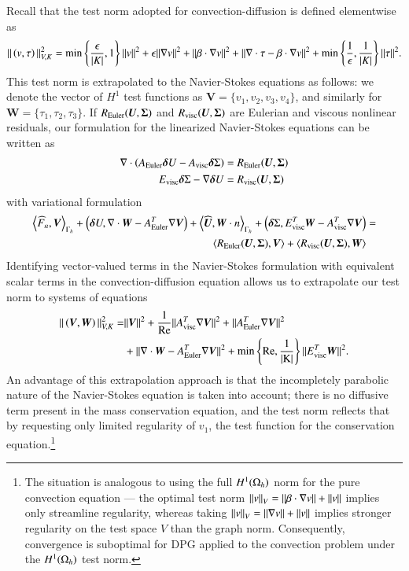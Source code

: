 Recall that the test norm adopted for convection-diffusion is defined elementwise as
\[
\|\left(v,\tau\right)\|_{V,K}^2 = \min\left\{\frac{\epsilon}{|K|},1\right\}\|v\|^2 + \epsilon \|\grad v\|^2 + \|\beta \cdot \grad v\|^2 + \| \div \tau-\beta\cdot\grad v\|^2 + \min\left\{\frac{1}{\epsilon},\frac{1}{|K|}\right\}\|\tau\|^2.
\]
This test norm is extrapolated to the Navier-Stokes equations as follows: we denote the vector of $H^1$ test functions as $\boldsymbol V=\{v_1,v_2,v_3,v_4\}$, and similarly for $\boldsymbol W = \{\tau_1,\tau_2,\tau_3\}$. If $R_{\rm Euler}(\boldsymbol U,\boldsymbol \Sigma)$ and $R_{\rm visc}(\boldsymbol U,\boldsymbol \Sigma)$ are Eulerian and viscous nonlinear residuals, our formulation for the linearized Navier-Stokes equations can be written as
\begin{align*}
\div \left(A_{\rm Euler}\boldsymbol \delta U - A_{\rm visc}\boldsymbol \delta \Sigma\right) &= R_{\rm Euler}(\boldsymbol U,\boldsymbol \Sigma)\\
E_{\rm visc}\boldsymbol  \delta \Sigma - \grad \boldsymbol \delta U &= R_{\rm visc}(\boldsymbol U,\boldsymbol \Sigma)
\end{align*}
with variational formulation
\begin{align*}
\LRa{\widehat{F}_n,\boldsymbol V}_{\Gh} + \left(\boldsymbol \delta U,\div \boldsymbol W - A_{\rm Euler}^T\grad \boldsymbol  V\right) + \LRa{\widehat{\boldsymbol U},\boldsymbol W\cdot n}_{\Gh} + \left(\boldsymbol \delta \Sigma,E_{\rm visc}^T\boldsymbol W - A_{\rm visc}^T\grad \boldsymbol  V\right) &= 
\\ \LRa{R_{\rm Euler}(\boldsymbol U,\boldsymbol \Sigma),\boldsymbol V} + \LRa{R_{\rm visc}(\boldsymbol U,\boldsymbol \Sigma),\boldsymbol W}
\end{align*}
Identifying vector-valued terms in the Navier-Stokes formulation with equivalent scalar terms in the convection-diffusion equation allows us to extrapolate our test norm to systems of equations
\begin{align*}
\|\left(\boldsymbol V,\boldsymbol W\right)\|_{V, K}^2 =& \|\boldsymbol V\|^2 + \frac{1}{\Reyn} \|A_{\rm visc}^T\grad \boldsymbol V\|^2 + \|A_{\rm Euler}^T \grad \boldsymbol V\|^2 \\
& + \| \div \boldsymbol W - A_{\rm Euler}^T \grad \boldsymbol V\|^2 + \min\left\{\Reyn,\frac{1}{|K|}\right\}\|E_{\rm visc}^T\boldsymbol W\|^2.
\end{align*}
An advantage of this extrapolation approach is that the incompletely parabolic nature of the Navier-Stokes equation is taken into account; there is no diffusive term present in the mass conservation equation, and the test norm reflects that by requesting only limited regularity of $v_1$, the test function for the conservation equation.\footnote{The situation is analogous to using the full $H^1(\Oh)$ norm for the pure convection equation --- the optimal test norm $\nor{v}_V = \nor{\beta\cdot \grad v} + \nor{v}$ implies only streamline regularity, whereas taking $\nor{v}_V = \nor{\grad v} + \nor{v}$ implies stronger regularity on the test space $V$ than the graph norm. Consequently, convergence is suboptimal for DPG applied to the convection problem under the $H^1(\Oh)$ test norm.}

